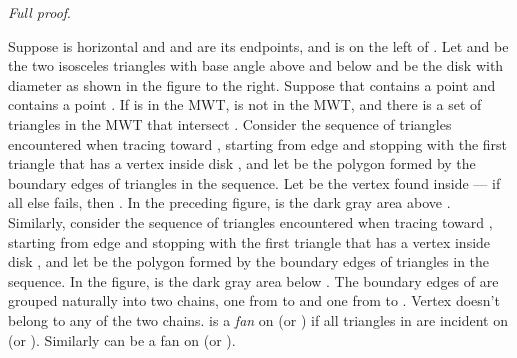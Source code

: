 \documentclass[final]{siamltex}
\newenvironment{fullproof}{\par{\it Full proof}. \ignorespaces}{\endproof}
\begin{document}
\begin{fullproof}
Suppose  is horizontal and  and  are its endpoints, and  is on the left of . 
Let  and  be the two isosceles triangles with base angle  
above and below  and  be the disk with diameter  as shown in the figure to the right.
Suppose that  contains a point  and  contains a point .
If  is in the MWT,  is not in the MWT, and there is a set of triangles in the MWT that 
intersect . Consider the sequence of triangles 
encountered when tracing  toward , starting from edge  and stopping with the 
first triangle that has a vertex inside disk , and let  be the polygon formed by the boundary
edges of triangles in the sequence.
Let  be the vertex found inside  --- if all else fails, then .
In the preceding figure,  is the dark gray area above .  
Similarly, consider the sequence of triangles 
encountered when tracing  toward , starting from edge  and stopping with the 
first triangle that has a vertex inside disk , and let  be the polygon formed by the boundary
edges of triangles in the sequence. In the figure,  is the dark gray area below .
The boundary edges of  are grouped naturally into two chains, one from  to  and 
one from  to . Vertex  doesn't belong to any of the two chains. 
 is a {\em fan} on  (or ) if all triangles in  are incident on  (or ). 
Similarly  can be a fan on  (or ).
\end{window}



\end{fullproof}
\end{document}
